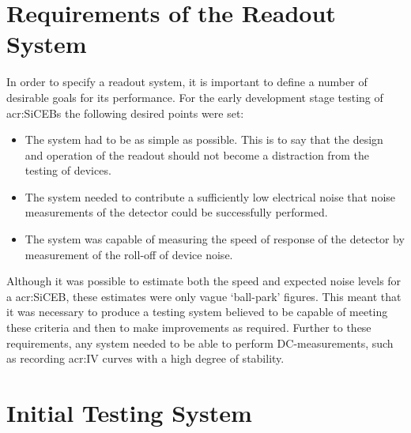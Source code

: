 \section{Requirements of the Readout System}\label{ssec:readout_requirements}
In order to specify a readout system, it is important to define a number of desirable goals for its performance. For the early development stage testing of \glspl{acr:SiCEB} the following desired points were set:
\begin{itemize}
\item The system had to be as simple as possible. This is to say that the design and operation of the readout should not become a distraction from the testing of devices.
\item The system needed to contribute a sufficiently low electrical noise that noise measurements of the detector could be successfully  performed.
\item The system was capable of measuring the speed of response of the detector by measurement of the roll-off of device noise.
\end{itemize}
Although it was possible to estimate both the speed and expected noise levels for a \gls{acr:SiCEB}, these estimates were only vague `ball-park' figures. This meant that it was necessary to produce a testing system believed to be capable of meeting these criteria and then to make improvements as required. Further to these requirements, any system needed to be able to perform DC-measurements, such as recording \gls{acr:IV} curves with a high degree of stability.

\section{Initial Testing System}
\label{sec:initial_readout_system}
